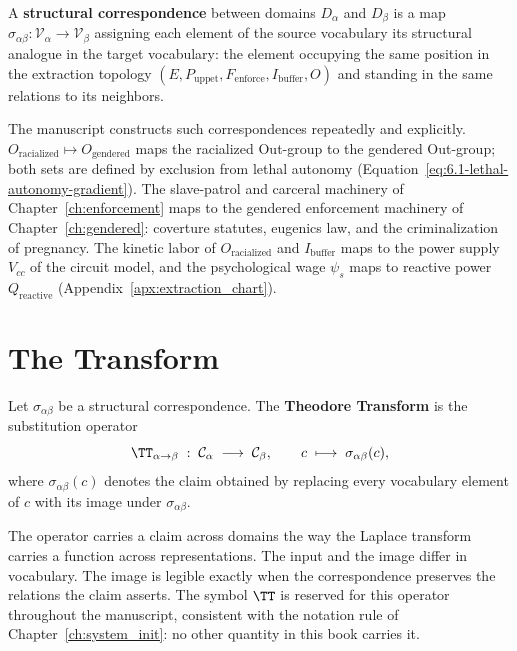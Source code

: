 \begin{definition}
A \textbf{structural correspondence} between domains $D_\alpha$ and $D_\beta$ is a map
$\sigma_{\alpha\beta} : \mathcal{V}_\alpha \to \mathcal{V}_\beta$ assigning each element of the
source vocabulary its structural analogue in the target vocabulary: the element occupying the same
position in the extraction topology $(E, P_{\text{uppet}}, F_{\text{enforce}}, I_{\text{buffer}},
O)$ and standing in the same relations to its neighbors.
\end{definition}

The manuscript constructs such correspondences repeatedly and explicitly.
$O_{\text{racialized}} \mapsto O_{\text{gendered}}$ maps the racialized Out-group to the gendered
Out-group; both sets are defined by exclusion from lethal autonomy
(Equation~\ref{eq:6.1-lethal-autonomy-gradient}). The slave-patrol and carceral machinery of
Chapter~\ref{ch:enforcement} maps to the gendered enforcement machinery of
Chapter~\ref{ch:gendered}: coverture statutes, eugenics law, and the criminalization of pregnancy.
The kinetic labor of $O_{\text{racialized}}$ and $I_{\text{buffer}}$ maps to the power supply
$V_{cc}$ of the circuit model, and the psychological wage $\psi_s$ maps to reactive power
$Q_{\text{reactive}}$ (Appendix~\ref{apx:extraction_chart}).

\section{The Transform}
\label{sec:tt_transform}

\begin{definition}
Let $\sigma_{\alpha\beta}$ be a structural correspondence. The \textbf{Theodore Transform} is the
substitution operator
\begin{equation}\label{eq:tt.1-transform}
\TT_{\alpha \to \beta} \;:\; \mathcal{C}_\alpha \;\longrightarrow\; \mathcal{C}_\beta,
\qquad c \;\longmapsto\; \sigma_{\alpha\beta}(c),
\end{equation}
where $\sigma_{\alpha\beta}(c)$ denotes the claim obtained by replacing every vocabulary element
of $c$ with its image under $\sigma_{\alpha\beta}$.
\end{definition}

The operator carries a claim across domains the way the Laplace transform carries a function
across representations. The input and the image differ in vocabulary. The image is legible exactly
when the correspondence preserves the relations the claim asserts. The symbol $\TT$ is
reserved for this operator throughout the manuscript, consistent with the notation rule of
Chapter~\ref{ch:system_init}: no other quantity in this book carries it.

